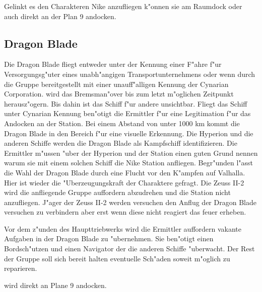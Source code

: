 Gelinkt es den Charakteren Nike anzufliegen k"onnen sie am Raumdock oder auch direkt an der Plan 9 andocken.

\subsection{Dragon Blade}
Die Dragon Blade fliegt entweder unter der Kennung einer F"ahre f"ur Versorgungsg"uter eines unabh"angigen Transportunternehmens oder wenn durch die Gruppe bereitgestellt mit einer unauff"alligen Kennung der Cynarian Corporation. \xl{} wird das Bremsman"over bis zum letzt m"oglichen Zeitpunkt herausz"ogern. Bis dahin ist das Schiff f"ur andere unsichtbar. Fliegt das Schiff unter Cynarian Kennung ben"otigt \xl{} die Ermittler f"ur eine Legitimation f"ur das Andocken an der Station. Bei einem Abstand von unter 1000 km kommt die Dragon Blade in den Bereich f"ur eine visuelle Erkennung. Die Hyperion und die anderen Schiffe werden die Dragon Blade als Kampfschiff identifizieren. Die Ermittler m"ussen "uber der Hyperion und der Station einen guten Grund nennen warum sie mit einem solchen Schiff die Nike Station anfliegen. Begr"unden l"asst die Wahl der Dragon Blade durch eine Flucht vor den K"ampfen auf Valhalla. Hier ist wieder die "Uberzeugungskraft der Charaktere gefragt. Die Zeuss II-2 wird die anfliegende Gruppe auffordern abzudrehen und die Station nicht anzufliegen. J"ager der Zeuss II-2 werden versuchen den Anflug der Dragon Blade versuchen zu verbindern aber erst wenn diese nicht reagiert das feuer erheben. 

Vor dem z"unden des Haupttriebwerks wird \xl{} die Ermittler auffordern vakante Aufgaben in der Dragon Blade zu "ubernehmen. Sie ben"otigt einen Bordsch"utzen und einen Navigator der die anderen Schiffe "uberwacht. Der Rest der Gruppe soll sich bereit halten eventuelle Sch"aden soweit m"oglich zu reparieren.

\xl{} wird direkt an Plane 9 andocken.


